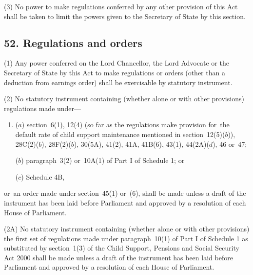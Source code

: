 \documentclass[12pt,a4paper]{article}
\begin{document}
(3) No power to make regulations conferred by any other provision of this Act shall be taken to limit the powers given to the Secretary of State by this section.


\subsection{52. Regulations and orders}

(1) Any power conferred on the Lord Chancellor, the Lord Advocate or the Secretary of State by this Act to make regulations or orders (other than a deduction from earnings order) shall be exercisable by statutory instrument.

(2) No statutory instrument containing (whether alone or with other provisions) regulations made under—
\begin{enumerate}\item[]
($a$) section~6(1), 12(4)  (so far as the regulations make provision for~the default rate of child support maintenance mentioned in section~12(5)($b$)), 28C(2)($b$), 28F(2)($b$), 30(5A), 41(2), 41A, 41B(6), 43(1), 44(2A)($d$), 46 or~47;

($b$) paragraph~3(2)  or~10A(1)  of Part I of Schedule 1; or

($c$) Schedule 4B,
\end{enumerate}
or~an order made under section~45(1)  or~(6), shall be made unless a draft of the instrument has been laid before Parliament and approved by a resolution of each House of Parliament.

(2A) No statutory instrument containing (whether alone or with other provisions) the first set of regulations made under paragraph~10(1)  of Part I of Schedule 1 as substituted by section~1(3)  of the Child Support, Pensions and Social Security Act 2000 shall be made unless a draft of the instrument has been laid before Parliament and approved by a resolution of each House of Parliament.
\end{document}
